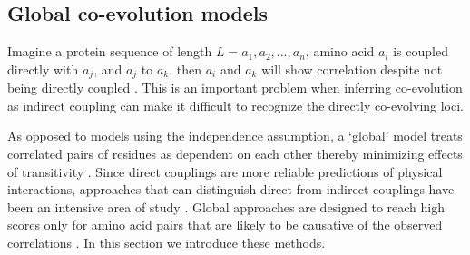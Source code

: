 \subsection{Global co-evolution models \label{sec:coevGlobal}}

Imagine a protein sequence of length $L = a_1, a_2, ... , a_n$, amino acid $a_i$ is coupled directly with $a_j$, and $a_j$ to $a_k$, then $a_i$ and $a_k$ will show correlation despite not being directly coupled \cite{weigt2009identification}.
This is an important problem when inferring co-evolution as indirect coupling can make it difficult to recognize the directly co-evolving loci.

As opposed to models using the independence assumption, a `global' model treats correlated pairs of residues as dependent on each other thereby minimizing effects of transitivity  \cite{marks2012protein}.
Since direct couplings are more reliable predictions of physical interactions, approaches that can distinguish direct from indirect couplings have been an intensive area of study \cite{de2013emerging}.
Global approaches are designed to reach high scores only for amino acid pairs that are likely to be causative of the observed correlations  \cite{marks2012protein}.
In this section we introduce these methods.



